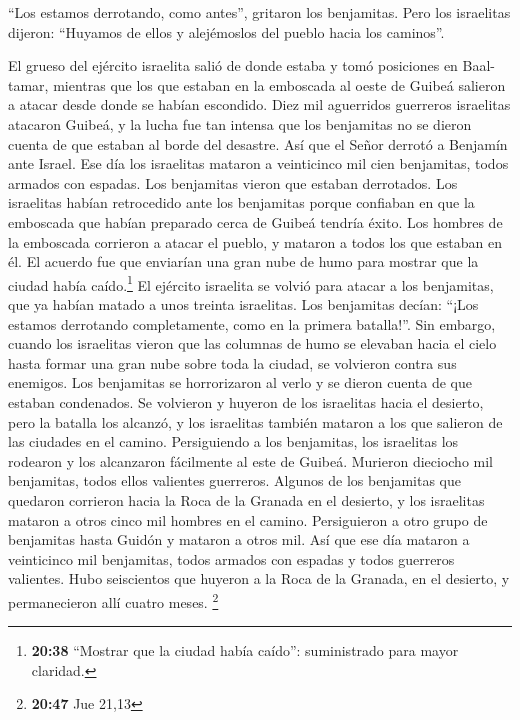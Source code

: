  ``Los estamos derrotando, como antes'', gritaron los
benjamitas. Pero los israelitas dijeron: ``Huyamos de ellos y
alejémoslos del pueblo hacia los caminos''.

 El grueso del ejército israelita salió de donde estaba y
tomó posiciones en Baal-tamar, mientras que los que estaban en la
emboscada al oeste de Guibeá salieron a atacar desde donde se habían
escondido.  Diez mil aguerridos guerreros israelitas
atacaron Guibeá, y la lucha fue tan intensa que los benjamitas no se
dieron cuenta de que estaban al borde del desastre.  Así
que el Señor derrotó a Benjamín ante Israel. Ese día los israelitas
mataron a veinticinco mil cien benjamitas, todos armados con espadas.
 Los benjamitas vieron que estaban derrotados. Los
israelitas habían retrocedido ante los benjamitas porque confiaban en
que la emboscada que habían preparado cerca de Guibeá tendría éxito.
 Los hombres de la emboscada corrieron a atacar el
pueblo, y mataron a todos los que estaban en él.  El
acuerdo fue que enviarían una gran nube de humo para mostrar que la
ciudad había caído.\footnote{\textbf{20:38} ``Mostrar que la ciudad
  había caído'': suministrado para mayor claridad.}  El
ejército israelita se volvió para atacar a los benjamitas, que ya habían
matado a unos treinta israelitas. Los benjamitas decían: ``¡Los estamos
derrotando completamente, como en la primera batalla!''. 
Sin embargo, cuando los israelitas vieron que las columnas de humo se
elevaban hacia el cielo hasta formar una gran nube sobre toda la ciudad,
 se volvieron contra sus enemigos. Los benjamitas se
horrorizaron al verlo y se dieron cuenta de que estaban condenados.
 Se volvieron y huyeron de los israelitas hacia el
desierto, pero la batalla los alcanzó, y los israelitas también mataron
a los que salieron de las ciudades en el camino. 
Persiguiendo a los benjamitas, los israelitas los rodearon y los
alcanzaron fácilmente al este de Guibeá.  Murieron
dieciocho mil benjamitas, todos ellos valientes guerreros.
 Algunos de los benjamitas que quedaron corrieron hacia
la Roca de la Granada en el desierto, y los israelitas mataron a otros
cinco mil hombres en el camino. Persiguieron a otro grupo de benjamitas
hasta Guidón y mataron a otros mil.  Así que ese día
mataron a veinticinco mil benjamitas, todos armados con espadas y todos
guerreros valientes.  Hubo seiscientos que huyeron a la
Roca de la Granada, en el desierto, y permanecieron allí cuatro meses.
\footnote{\textbf{20:47} Jue 21,13}

